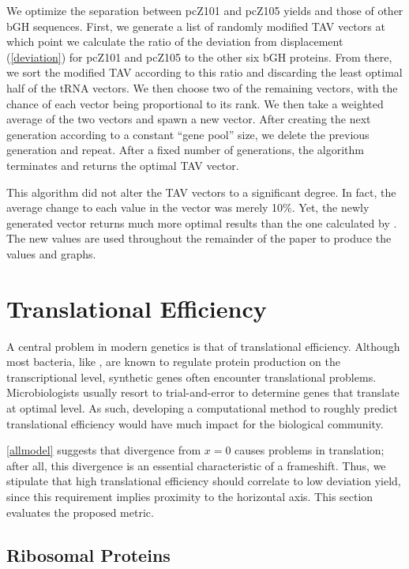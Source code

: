 \documentclass[12pt]{article}
\numberwithin{equation}{section}
\begin{document}
We optimize the separation between pcZ101 and pcZ105 yields and those of other bGH sequences.  
First, we generate a list of randomly modified TAV vectors at which
point we calculate the ratio of the deviation from
displacement (\autoref{deviation}) for pcZ101 and pcZ105 to the other
six bGH proteins. From there, we sort the modified TAV according to
this ratio and discarding the least optimal half of the tRNA
vectors. We then choose two of the remaining vectors, with the chance
of each vector being proportional to its rank.  We then take a
weighted average of the two vectors and spawn a new vector.  After
creating the next generation according to a constant ``gene pool''
size, we delete the previous generation and repeat. After a fixed
number of generations, the algorithm terminates and returns the
optimal TAV vector.

This algorithm did not alter the TAV vectors to a significant degree.
In fact, the average change to each value in the vector was merely
10\%.  Yet, the newly generated vector returns much more optimal
results than the one calculated by \citeauthor{lalit:embs}.  The new values
are used throughout the remainder of the paper to produce the 
values and graphs.

\section{Translational Efficiency}


A central problem in modern genetics is that of translational efficiency.
Although most bacteria, like \ecoli, are known to regulate protein production
on the transcriptional level, synthetic genes often encounter translational
problems.  Microbiologists usually resort to trial-and-error to determine genes
that translate at optimal level.  As such, developing a computational method
to roughly predict translational efficiency would have much impact for the 
biological community.

\autoref{allmodel} suggests that divergence from $x=0$ causes
problems in translation; after all, this divergence is an essential characteristic
of a frameshift.  Thus, we stipulate that high translational efficiency should correlate to low deviation yield,
since this requirement implies proximity to the horizontal axis.  This section
evaluates the proposed metric.

\subsection{Ribosomal Proteins}
\end{document}
